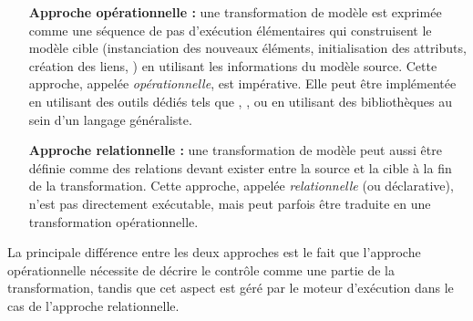 \begin{itemize}

  \item[\textbf{Approche opérationnelle :}] une transformation de modèle est exprimée
    comme une séquence de pas d'exécution élémentaires qui construisent le
    modèle cible (instanciation des nouveaux éléments, initialisation
    des attributs, création des liens, {\etc}) en utilisant les informations du
    modèle source.  Cette approche, appelée \emph{opérationnelle},
    est impérative.  Elle peut être implémentée en utilisant des outils dédiés
    tels que {\kermeta}, {\qvto}, ou en utilisant des bibliothèques
    au sein d'un langage généraliste.
  \item[\textbf{Approche relationnelle :}] une transformation de modèle peut aussi être
    définie comme des relations devant exister entre la source et la cible à la
    fin de la transformation. Cette approche, appelée
    \emph{relationnelle} (ou déclarative), n'est pas directement exécutable,
    mais peut parfois être traduite en une transformation opérationnelle.
\end{itemize}
La principale différence entre les deux approches est le fait que l'approche
opérationnelle nécessite de décrire le contrôle comme une partie de la
transformation, tandis que cet aspect est géré par le moteur d'exécution dans le
cas de l'approche relationnelle.

